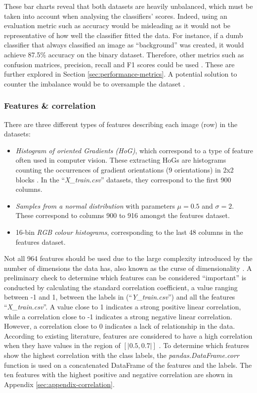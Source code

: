\documentclass[letterpaper,12pt]{article}
\begin{document}
These bar charts reveal that both datasets are heavily unbalanced, which must be taken into account when analysing the classifiers' scores. Indeed, using an  evaluation metric such as accuracy would be misleading as it would not be representative of how well the classifier fitted the data. For instance, if a dumb classifier that always classified an image as ``background'' was created, it would achieve 87.5\% accuracy on the binary dataset. Therefore, other metrics such as confusion matrices, precision, recall and F1 scores could be used \cite{Geron2019}. These are further explored in Section \ref{sec:performance-metrics}. A potential solution to counter the imbalance would be to oversample the dataset \cite{becker2020}.

\subsubsection{Features \& correlation}

There are three different types of features describing each image (row) in the datasets:
\begin{itemize}
    \item \textit{Histogram of oriented Gradients (HoG)}, which correspond to a type of feature often used in computer vision. These extracting HoGs are histograms counting the occurrences of gradient orientations (9 orientations) in 2x2 blocks \cite{Dalal2005}. In the ``\textit{X\_train.csv}'' datasets, they correspond to the first 900 columns.
    \item \textit{Samples from a normal distribution} with parameters $\mu=0.5$ and $\sigma=2$. These correspond to columns 900 to 916 amongst the features dataset.
    \item 16-bin \textit{RGB colour histograms}, corresponding to the last 48 columns in the features dataset.
\end{itemize}

Not all 964 features should be used due to the large complexity introduced by the number of dimensions the data has, also known as the curse of dimensionality \cite{Geron2019}. A preliminary check to determine which features can be considered ``important'' is conducted by calculating the standard correlation coefficient, a value ranging between -1 and 1, between the labels in (``\textit{Y\_train.csv}'') and all the features ``\textit{X\_train.csv}''. A value close to 1 indicates a strong positive linear correlation, while a correlation close to -1 indicates a strong negative linear correlation. However, a correlation close to 0 indicates a lack of relationship in the data. According to existing literature, features are considered to have a high correlation when they have values in the region of $[|0.5,0.7|]$ \cite{Geron2019} \cite{Badr2019}. To determine which features show the highest correlation with the class labels, the \textit{pandas.DataFrame.corr} function is used on a concatenated DataFrame of the features and the labels. The ten features with the highest positive and negative correlation are shown in Appendix \ref{sec:appendix-correlation}.\\
\end{document}
